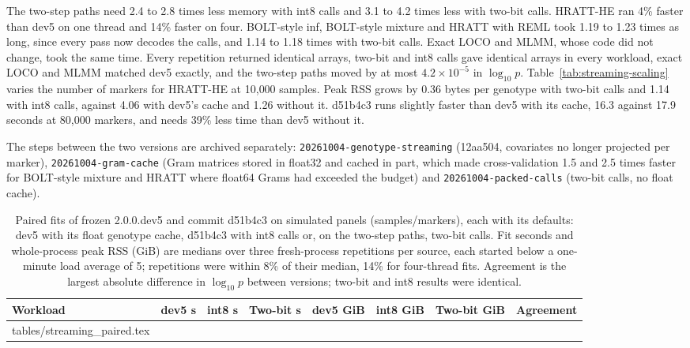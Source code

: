 \documentclass[11pt]{article}
\makeatletter
\newcommand{\code}[1]{\texttt{#1}}
\newcommand{\tabinput}[1]{\@@input #1 }
\makeatother
\begin{document}
The two-step paths need 2.4 to 2.8 times less memory with int8 calls and 3.1
to 4.2 times less with two-bit calls. HRATT-HE ran 4\% faster than dev5 on one
thread and 14\% faster on four. BOLT-style inf, BOLT-style mixture and HRATT with REML took
1.19 to 1.23 times as long, since every pass now decodes the calls, and 1.14 to
1.18 times with two-bit calls. Exact LOCO and MLMM, whose code did not change,
took the same time. Every repetition returned identical arrays, two-bit and int8
calls gave identical arrays in every workload, exact LOCO and MLMM matched dev5
exactly, and the two-step paths moved by at most $4.2\times10^{-5}$ in
$\log_{10}p$. Table~\ref{tab:streaming-scaling} varies the number of markers
for HRATT-HE at 10{,}000 samples. Peak RSS grows by 0.36 bytes per genotype
with two-bit calls and 1.14 with int8 calls, against 4.06 with dev5's cache and
1.26 without it. d51b4c3 runs slightly faster than dev5 with its
cache, 16.3 against 17.9 seconds at 80{,}000 markers, and needs 39\% less time
than dev5 without it.

The steps between the two versions are archived separately:
\code{20261004-}\allowbreak\code{genotype-streaming} (12aa504, covariates no
longer projected per marker), \code{20261004-}\allowbreak\code{gram-cache}
(Gram matrices stored in float32 and cached in part, which made
cross-validation 1.5 and 2.5 times faster for BOLT-style mixture and HRATT where float64
Grams had exceeded the budget) and \code{20261004-}\allowbreak\code{packed-calls}
(two-bit calls, no float cache).

\begin{table}[htbp]
 \centering\small
 \caption{Paired fits of frozen 2.0.0.dev5 and commit d51b4c3 on simulated
 panels (samples/markers), each with its defaults: dev5 with its float
 genotype cache, d51b4c3 with int8 calls or, on the two-step
 paths, two-bit calls. Fit seconds and whole-process peak RSS (GiB) are
 medians over three fresh-process repetitions per source, each started below
 a one-minute load average of 5; repetitions were within 8\% of their median,
 14\% for four-thread fits. Agreement is the largest absolute difference in
 $\log_{10}p$ between versions; two-bit and int8 results were identical.}
 \label{tab:streaming-paired}
 \begin{tabularx}{\textwidth}{@{}>{\raggedright\arraybackslash}Xrrrrrrl@{}}
 \toprule
 Workload & dev5 s & int8 s & Two-bit s & dev5 GiB & int8 GiB & Two-bit GiB & Agreement \\
 \midrule
 \tabinput{tables/streaming_paired.tex}
 \bottomrule
 \end{tabularx}
\end{table}
\end{document}
